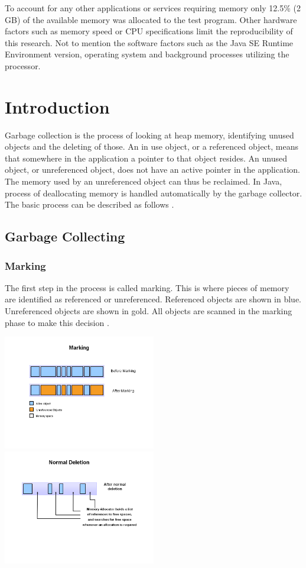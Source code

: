 \documentclass[11pt,a4paper]{article}
\begin{document}
To account for any other applications or services requiring memory only 12.5\% (2 GB) of the available memory was allocated to the test program. Other hardware factors such as memory speed or CPU specifications limit the reproducibility of this research. Not to mention the software factors such as the Java SE Runtime Environment version, operating system and background processes utilizing the processor.

\newpage
\tableofcontents

\newpage
\section{Introduction}
Garbage collection is the process of looking at heap memory, identifying unused objects and the deleting of those. An in use object, or a referenced object, means that somewhere in the application a pointer to that object resides. An unused object, or unreferenced object, does not have an active pointer in the application. The memory used by an unreferenced object can thus be reclaimed. In Java, process of deallocating memory is handled automatically by the garbage collector. The basic process can be described as follows \cite{ORACLE_GC_BASICS}.

\subsection{Garbage Collecting}
\subsubsection*{Marking}
The first step in the process is called marking. This is where pieces of memory are identified as referenced or unreferenced. Referenced objects are shown in blue. Unreferenced objects are shown in gold. All objects are scanned in the marking phase to make this decision \cite{ORACLE_GC_BASICS}.

\includegraphics[width=0.5\textwidth]{Slide3.PNG}
\includegraphics[width=0.5\textwidth]{Slide1b.PNG}
\end{document}
